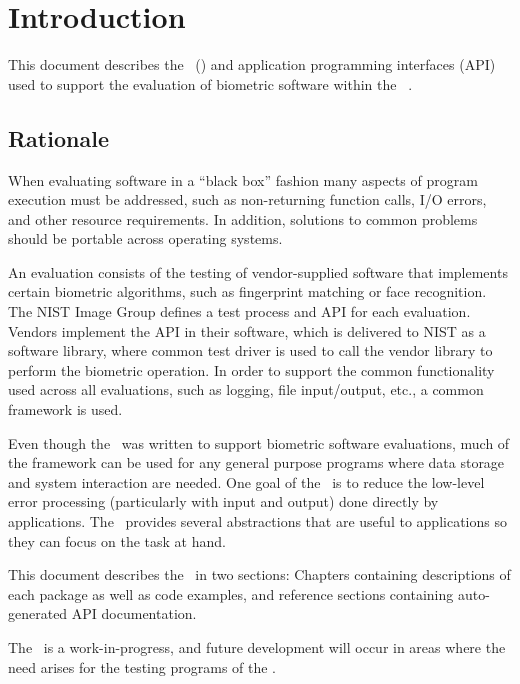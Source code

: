 \chapter{Introduction}

This document describes the \lname\ (\sname) and application programming 
interfaces (API) used to support the evaluation of biometric software within 
the \nistig\ \cite{nistig}.

\section{Rationale}

When evaluating software in a ``black box'' fashion many aspects
of program execution must be addressed, such as non-returning function calls,
I/O errors, and other resource requirements. In addition, solutions to common
problems should be portable across operating systems.

An evaluation consists of the testing of vendor-supplied
software that implements certain biometric algorithms, such as fingerprint
matching or face recognition. The NIST Image Group defines a test process
and API for each evaluation. Vendors implement the API in their software, which
is delivered to NIST as a software library, where common test driver is used to
call the vendor library to perform the biometric operation.
In order to support the common functionality used across all evaluations, such
as logging, file input/output, etc., a common framework is used.

Even though the \lname\ was written to support biometric software evaluations,
much of the framework can be used for any general purpose programs where data
storage and system interaction are needed. One goal of the \sname\ is to
reduce the low-level error processing (particularly with input and output)
done directly by applications. The \lname\ provides several abstractions that
are useful to applications so they can focus on the task at hand.

This document describes the \sname\ in two sections: Chapters containing
descriptions of each package as well as code examples, and reference sections
containing auto-generated API documentation.

The \sname\ is a work-in-progress, and future development will occur in areas
where the need arises for the testing programs of the \nistig.
